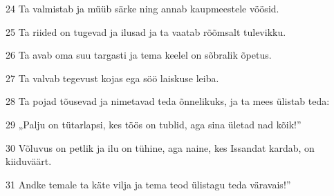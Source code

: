 \par 24 Ta valmistab ja müüb särke ning annab kaupmeestele vöösid.
\par 25 Ta riided on tugevad ja ilusad ja ta vaatab rõõmsalt tulevikku.
\par 26 Ta avab oma suu targasti ja tema keelel on sõbralik õpetus.
\par 27 Ta valvab tegevust kojas ega söö laiskuse leiba.
\par 28 Ta pojad tõusevad ja nimetavad teda õnnelikuks, ja ta mees ülistab teda:
\par 29 „Palju on tütarlapsi, kes töös on tublid, aga sina ületad nad kõik!”
\par 30 Võluvus on petlik ja ilu on tühine, aga naine, kes Issandat kardab, on kiiduväärt.
\par 31 Andke temale ta käte vilja ja tema teod ülistagu teda väravais!”



